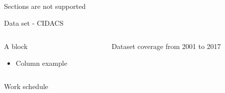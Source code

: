 \documentclass[ignorenonframetext,]{beamer}
\providecommand{\tightlist}{%
  \setlength{\itemsep}{0pt}\setlength{\parskip}{0pt}}
\begin{document}
\begin{frame}{Sections are not supported}
\protect\hypertarget{sections-are-not-supported}{}
\begin{block}{Data set - CIDACS}
\protect\hypertarget{data-set---cidacs}{}
\begin{columns}[T]
\begin{column}{0.5\textwidth}
\begin{block}{A block}
\protect\hypertarget{a-block}{}
\begin{itemize}
\tightlist
\item
  Column example
\end{itemize}
\end{block}
\end{column}

\begin{column}{0.5\textwidth}
\tiny

Dataset coverage from 2001 to 2017
\end{column}
\end{columns}
\end{block}

\begin{block}{Work schedule}
\protect\hypertarget{work-schedule}{}
\end{block}
\end{frame}
\end{document}
